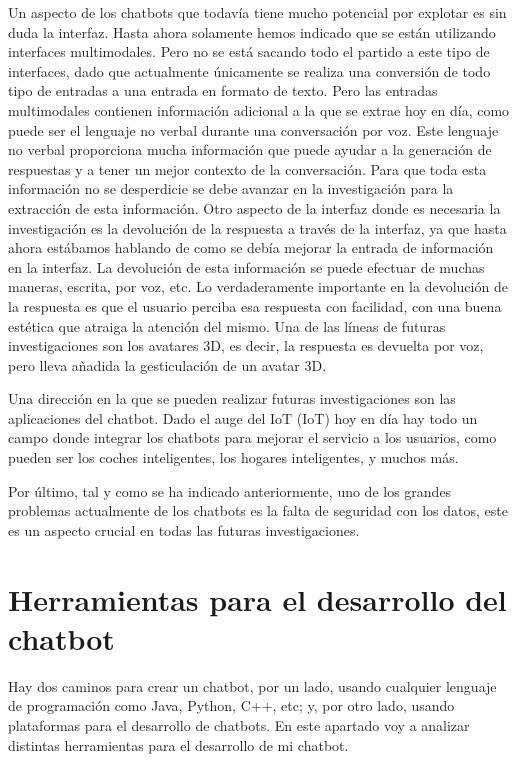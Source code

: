 Un aspecto de los chatbots que todavía tiene mucho potencial por explotar es sin duda la interfaz. Hasta ahora solamente hemos indicado que se están utilizando interfaces multimodales. Pero no se está sacando todo el partido a este tipo de interfaces, dado que actualmente únicamente se realiza una conversión de todo tipo de entradas a una entrada en formato de texto. Pero las entradas multimodales contienen información adicional a la que se extrae hoy en día, como puede ser el lenguaje no verbal durante una conversación por voz. Este lenguaje no verbal proporciona mucha información que puede ayudar a la generación de respuestas y a tener un mejor contexto de la conversación. Para que toda esta información no se desperdicie se debe avanzar en la investigación para la extracción de esta información. Otro aspecto de la interfaz donde es necesaria la investigación es la devolución de la respuesta a través de la interfaz, ya que hasta ahora estábamos hablando de como se debía mejorar la entrada de información en la interfaz. La devolución de esta información se puede efectuar de muchas maneras, escrita, por voz, etc. Lo verdaderamente importante en la devolución de la respuesta es que el usuario perciba esa respuesta con facilidad, con una buena estética que atraiga la atención del mismo. Una de las líneas de futuras investigaciones son los avatares 3D, es decir, la respuesta es devuelta por voz, pero lleva añadida la gesticulación de un avatar 3D.

Una dirección en la que se pueden realizar futuras investigaciones son las aplicaciones del chatbot. Dado el auge del \gls{IoT} (IoT) hoy en día hay todo un campo donde integrar los chatbots para mejorar el servicio a los usuarios, como pueden ser los coches inteligentes, los hogares inteligentes, y muchos más.

Por último, tal y como se ha indicado anteriormente, uno de los grandes problemas actualmente de los chatbots es la falta de seguridad con los datos, este es un aspecto crucial en todas las futuras investigaciones.

\section{Herramientas para el desarrollo del chatbot}

Hay dos caminos para crear un chatbot, por un lado, usando cualquier lenguaje de programación como Java, Python, C++, etc; y, por otro lado, usando plataformas para el desarrollo de chatbots. En este apartado voy a analizar distintas herramientas para el desarrollo de mi chatbot.

